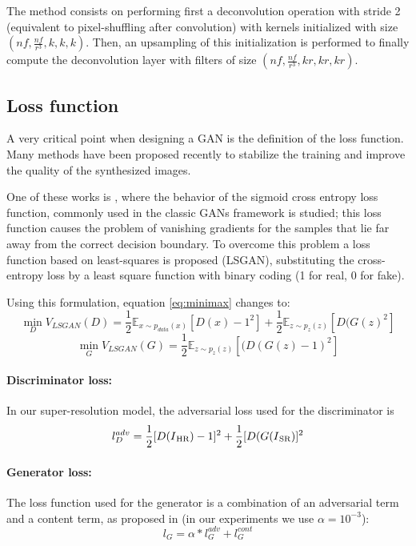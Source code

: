 \documentclass{article}
\begin{document}
The method consists on performing first a deconvolution operation with stride 2 (equivalent to pixel-shuffling after convolution) with kernels initialized with size $(nf, \frac{nf}{r^{3}}, k, k, k)$. Then, an upsampling of this initialization is performed to finally compute the deconvolution layer with filters of size $(nf, \frac{nf}{r^{3}}, kr, kr, kr)$.

\subsection{Loss function}
\label{ssec:loss}
A very critical point when designing a GAN is the definition of the loss function.
Many methods have been proposed recently to stabilize the training and improve the quality of the synthesized images.

One of these works is \cite{mao:lsgan}, where the behavior of the sigmoid cross entropy loss function, commonly used in the classic GANs framework is studied; this loss function causes the problem of vanishing gradients for the samples that lie far away from the correct decision boundary. To overcome this problem a loss function based on least-squares is proposed (LSGAN), substituting the cross-entropy loss by a least square function with binary coding (1 for real, 0 for fake).

Using this formulation, equation \ref{eq:minimax} changes to:
\begin{equation}\label{eq:min_D}
	\min_{D} V_{LSGAN}(D) = \frac{1}{2} \mathbb{E}_{x \sim p_{data}(x)}[D(x)-1^2]+ \frac{1}{2} \mathbb{E}_{z \sim p_{z}(z)}[D(G(z)^2]
\end{equation}
\begin{equation}\label{eq:min_G}
	\min_{G} V_{LSGAN}(G) = \frac{1}{2} \mathbb{E}_{z \sim p_{z}(z)}[(D(G(z)-1)^2]
\end{equation}

\paragraph{Discriminator loss:}
In our super-resolution model, the adversarial loss used for the discriminator is
\begin{equation}\label{eq:cost_DSR}
	l_{D}^{adv} = \frac{1}{2}[D(I\textsubscript{HR})-1]^{2} + \frac{1}{2}[D(G(I\textsubscript{SR})]^{2}
\end{equation}

\paragraph{Generator loss:}
The loss function used for the generator is a combination of an adversarial term and a content term, as proposed in \cite{ledig:srgan} (in our experiments we use $\alpha = 10^{-3}$):
\begin{equation}
l_{G} = \alpha*l_{G}^{adv} + l_{G}^{cont}
\end{equation}
\end{document}
